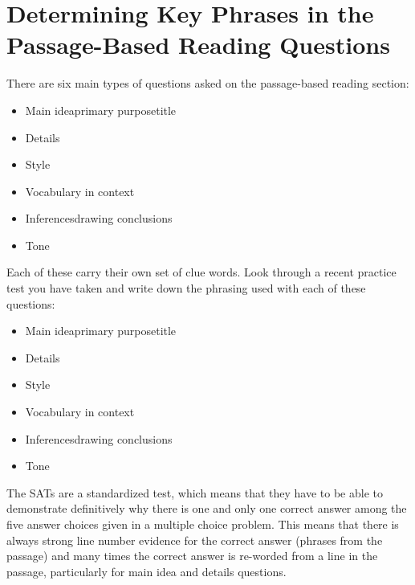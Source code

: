 \section{Determining Key Phrases in the Passage-Based Reading Questions}

There are six main types of questions asked on the passage-based reading section:

\begin{itemize}
\item Main idea\/primary purpose\/title
\item Details
\item Style
\item Vocabulary in context
\item Inferences\/drawing conclusions
\item Tone
\end{itemize}

Each of these carry their own set of clue words. Look through a recent practice test you have taken and write down the phrasing used with each of these questions:

\begin{itemize}
\item Main idea\/primary purpose\/title \hrulefill
\item Details \hrulefill
\item Style \hrulefill
\item Vocabulary in context \hrulefill
\item Inferences\/drawing conclusions \hrulefill
\item Tone \hrulefill
\end{itemize}

The SATs are a standardized test, which means that they have to be able to demonstrate definitively why there is one and only one correct answer among the five answer choices given in a multiple choice problem. This means that there is always strong line number evidence for the correct answer (phrases from the passage) and many times the correct answer is re-worded from
a line in the passage, particularly for main idea and details questions.